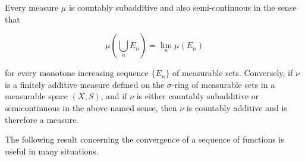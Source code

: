 Every measure $\mu$ is countably subadditive and also semi-continuous in the sense that

$$\mu \left( \bigcup_{n} E_{n} \right) = \lim_{n} \mu(E_{n})$$

for every monotone increasing sequence $\{E_{n}\}$ of measurable sets. Conversely, if $\nu$ is a finitely additive measure defined on the $\sigma$-ring of measurable sets in a measurable space $(X, S)$, and if $\nu$ is either countably subadditive or semicontinuous in the above-named sense, then $\nu$ is countably additive and is therefore a measure.

The following result concerning the convergence of a sequence of functions is useful in many situations.
